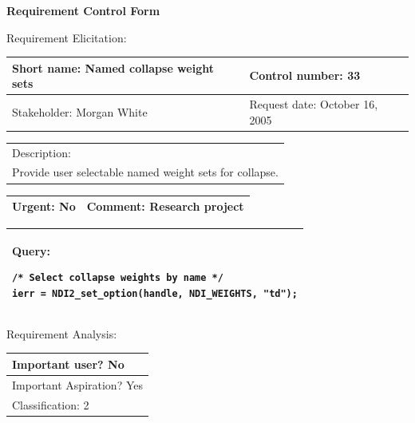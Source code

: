 \begin{center}\Large\bf
Requirement Control Form
\end{center}
\vspace{24pt}

Requirement Elicitation:

\begin{tabular}{|p{211pt}|p{211pt}|} \hline
Short name: Named collapse weight sets & Control number: 33\\ \hline
Stakeholder: Morgan White & Request date: October 16, 2005\\
\end{tabular}
\begin{tabular}{|p{433pt}|} \hline
Description: \\ 
Provide user selectable named weight sets for collapse.\\
\hline
\end{tabular} 
\begin{tabular}{|p{211pt}|p{211pt}|} \hline
Urgent: No & Comment: Research project\\ \hline
\end{tabular}

\vspace{12pt}

\begin{tabular}{|p{433pt}|} \hline
Query: 
\begin{verbatim}
/* Select collapse weights by name */
ierr = NDI2_set_option(handle, NDI_WEIGHTS, "td");
\end{verbatim}
\\ \hline
\end{tabular}
\vspace{24pt}

Requirement Analysis:

\begin{tabular}{|p{433pt}|} \hline
Important user? No \\ \hline
Important Aspiration? Yes \\ \hline
Classification: 2 \\ \hline
\end{tabular}
\vspace{24pt}
